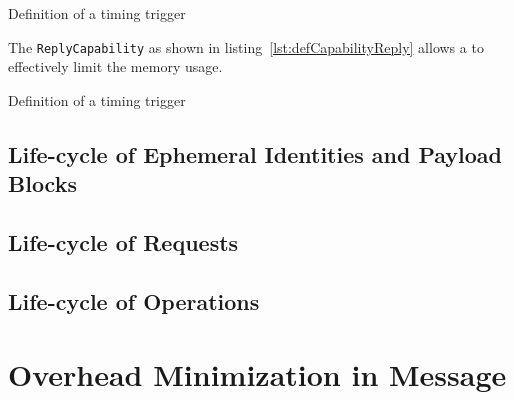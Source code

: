 \begin{lstfloat}[ht]
	
	\caption{Definition of a timing trigger}
	\label{lst:defUsage}
\end{lstfloat}

The \texttt{ReplyCapability} as shown in listing~\ref{lst:defCapabilityReply} allows a \VortexNode{} to effectively limit the memory usage. 
\begin{lstfloat}[ht]
	
	\caption{Definition of a timing trigger}
	\label{lst:defCapabilityReply}
\end{lstfloat}


\subsection{Life-cycle of Ephemeral Identities and Payload Blocks}

\subsection{Life-cycle of Requests}

\subsection{Life-cycle of Operations}

\section{Overhead Minimization in Message}


